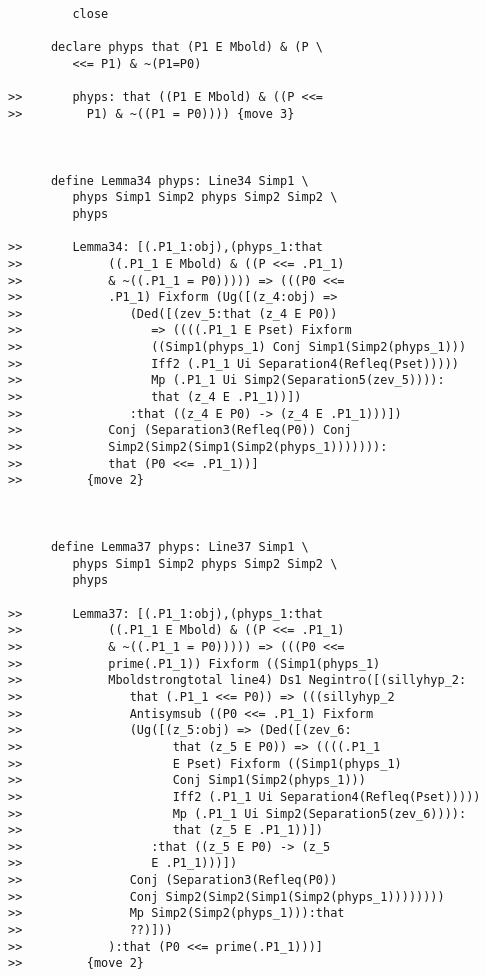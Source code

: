 \documentclass[12pt]{article}
\begin{document}
\begin{verbatim}
         close

      declare phyps that (P1 E Mbold) & (P \
         <<= P1) & ~(P1=P0)

>>       phyps: that ((P1 E Mbold) & ((P <<=
>>         P1) & ~((P1 = P0)))) {move 3}



      define Lemma34 phyps: Line34 Simp1 \
         phyps Simp1 Simp2 phyps Simp2 Simp2 \
         phyps

>>       Lemma34: [(.P1_1:obj),(phyps_1:that
>>            ((.P1_1 E Mbold) & ((P <<= .P1_1)
>>            & ~((.P1_1 = P0))))) => (((P0 <<=
>>            .P1_1) Fixform (Ug([(z_4:obj) =>
>>               (Ded([(zev_5:that (z_4 E P0))
>>                  => ((((.P1_1 E Pset) Fixform
>>                  ((Simp1(phyps_1) Conj Simp1(Simp2(phyps_1)))
>>                  Iff2 (.P1_1 Ui Separation4(Refleq(Pset)))))
>>                  Mp (.P1_1 Ui Simp2(Separation5(zev_5)))):
>>                  that (z_4 E .P1_1))])
>>               :that ((z_4 E P0) -> (z_4 E .P1_1)))])
>>            Conj (Separation3(Refleq(P0)) Conj
>>            Simp2(Simp2(Simp1(Simp2(phyps_1))))))):
>>            that (P0 <<= .P1_1))]
>>         {move 2}



      define Lemma37 phyps: Line37 Simp1 \
         phyps Simp1 Simp2 phyps Simp2 Simp2 \
         phyps

>>       Lemma37: [(.P1_1:obj),(phyps_1:that
>>            ((.P1_1 E Mbold) & ((P <<= .P1_1)
>>            & ~((.P1_1 = P0))))) => (((P0 <<=
>>            prime(.P1_1)) Fixform ((Simp1(phyps_1)
>>            Mboldstrongtotal line4) Ds1 Negintro([(sillyhyp_2:
>>               that (.P1_1 <<= P0)) => (((sillyhyp_2
>>               Antisymsub ((P0 <<= .P1_1) Fixform
>>               (Ug([(z_5:obj) => (Ded([(zev_6:
>>                     that (z_5 E P0)) => ((((.P1_1
>>                     E Pset) Fixform ((Simp1(phyps_1)
>>                     Conj Simp1(Simp2(phyps_1)))
>>                     Iff2 (.P1_1 Ui Separation4(Refleq(Pset)))))
>>                     Mp (.P1_1 Ui Simp2(Separation5(zev_6)))):
>>                     that (z_5 E .P1_1))])
>>                  :that ((z_5 E P0) -> (z_5
>>                  E .P1_1)))])
>>               Conj (Separation3(Refleq(P0))
>>               Conj Simp2(Simp2(Simp1(Simp2(phyps_1))))))))
>>               Mp Simp2(Simp2(phyps_1))):that
>>               ??)]))
>>            ):that (P0 <<= prime(.P1_1)))]
>>         {move 2}




\end{verbatim}
\end{document}
